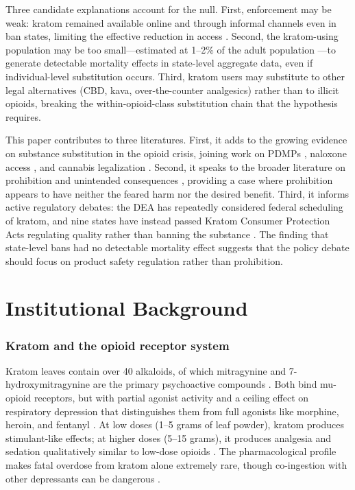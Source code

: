 \documentclass[12pt]{article}
\begin{document}
Three candidate explanations account for the null. First, enforcement may be weak: kratom remained available online and through informal channels even in ban states, limiting the effective reduction in access \citep{henningfield2022challenge}. Second, the kratom-using population may be too small---estimated at 1--2\% of the adult population \citep{palamar2021past}---to generate detectable mortality effects in state-level aggregate data, even if individual-level substitution occurs. Third, kratom users may substitute to other legal alternatives (CBD, kava, over-the-counter analgesics) rather than to illicit opioids, breaking the within-opioid-class substitution chain that the hypothesis requires.

This paper contributes to three literatures. First, it adds to the growing evidence on substance substitution in the opioid crisis, joining work on PDMPs \citep{buchmueller2018effect, dave2021effect}, naloxone access \citep{doleac2022moral, rees2019takes}, and cannabis legalization \citep{bradford2016medical, powell2018recreational}. Second, it speaks to the broader literature on prohibition and unintended consequences \citep{miron2004drug, cunningham2018decriminalizing}, providing a case where prohibition appears to have neither the feared harm nor the desired benefit. Third, it informs active regulatory debates: the DEA has repeatedly considered federal scheduling of kratom, and nine states have instead passed Kratom Consumer Protection Acts regulating quality rather than banning the substance \citep{grundmann2023kratom, prozialeck2021update}. The finding that state-level bans had no detectable mortality effect suggests that the policy debate should focus on product safety regulation rather than prohibition.

\section{Institutional Background}

\subsubsection*{Kratom and the opioid receptor system} Kratom leaves contain over 40 alkaloids, of which mitragynine and 7-hydroxymitragynine are the primary psychoactive compounds \citep{kruegel2016synthetic}. Both bind mu-opioid receptors, but with partial agonist activity and a ceiling effect on respiratory depression that distinguishes them from full agonists like morphine, heroin, and fentanyl \citep{prozialeck2012pharmacology}. At low doses (1--5 grams of leaf powder), kratom produces stimulant-like effects; at higher doses (5--15 grams), it produces analgesia and sedation qualitatively similar to low-dose opioids \citep{boyer2008self}. The pharmacological profile makes fatal overdose from kratom alone extremely rare, though co-ingestion with other depressants can be dangerous \citep{olsen2020unintentional}.
\end{document}
